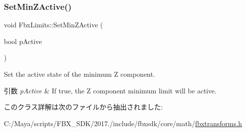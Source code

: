 \subsubsection{\texorpdfstring{Set\+Min\+Z\+Active()}{SetMinZActive()}}
{\footnotesize\ttfamily void Fbx\+Limits\+::\+Set\+Min\+Z\+Active (\begin{DoxyParamCaption}\item[{bool}]{p\+Active }\end{DoxyParamCaption})}

Set the active state of the minimum Z component. 
\begin{DoxyParams}{引数}
{\em p\+Active} & If true, the Z component minimum limit will be active. \\
\hline
\end{DoxyParams}


このクラス詳解は次のファイルから抽出されました\+:\begin{DoxyCompactItemize}
\item 
C\+:/\+Maya/scripts/\+F\+B\+X\+\_\+\+S\+D\+K/2017./include/fbxsdk/core/math/\hyperlink{fbxtransforms_8h}{fbxtransforms.\+h}\end{DoxyCompactItemize}
